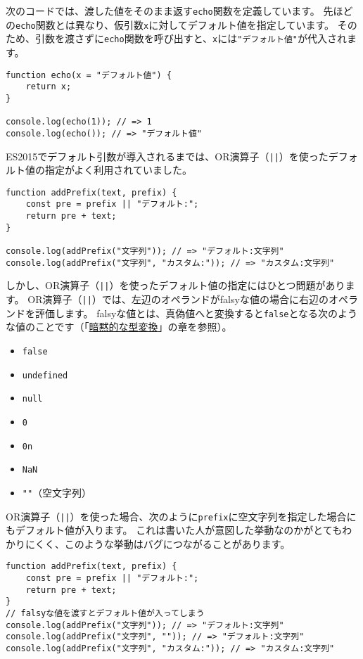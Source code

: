次のコードでは、渡した値をそのまま返す\texttt{echo}関数を定義しています。
先ほどの\texttt{echo}関数とは異なり、仮引数\texttt{x}に対してデフォルト値を指定しています。
そのため、引数を渡さずに\texttt{echo}関数を呼び出すと、\texttt{x}には\texttt{"デフォルト値"}が代入されます。

\begin{lstlisting}
function echo(x = "デフォルト値") {
    return x;
}

console.log(echo(1)); // => 1
console.log(echo()); // => "デフォルト値"
\end{lstlisting}

\enlargethispage{\baselineskip}ES2015でデフォルト引数が導入されるまでは、OR演算子（\texttt{||}）を使ったデフォルト値の指定がよく利用されていました。

\begin{lstlisting}
function addPrefix(text, prefix) {
    const pre = prefix || "デフォルト:";
    return pre + text;
}

console.log(addPrefix("文字列")); // => "デフォルト:文字列"
console.log(addPrefix("文字列", "カスタム:")); // => "カスタム:文字列"
\end{lstlisting}

しかし、OR演算子（\texttt{||}）を使ったデフォルト値の指定にはひとつ問題があります。
OR演算子（\texttt{||}）では、左辺のオペランドがfalsyな値の場合に右辺のオペランドを評価します。
falsyな値とは、真偽値へと変換すると\texttt{false}となる次のような値のことです（「\hyperlink{implicit-coercion}{暗黙的な型変換}」の章を参照）。

\begin{itemize}
\item
  \texttt{false}
\item
  \texttt{undefined}
\item
  \texttt{null}
\item
  \texttt{0}
\item
  \texttt{0n}
\item
  \texttt{NaN}
\item
  \texttt{""}（空文字列）
\end{itemize}

OR演算子（\texttt{||}）を使った場合、次のように\texttt{prefix}に空文字列を指定した場合にもデフォルト値が入ります。
これは書いた人が意図した挙動なのかがとてもわかりにくく、このような挙動はバグにつながることがあります。

\begin{lstlisting}
function addPrefix(text, prefix) {
    const pre = prefix || "デフォルト:";
    return pre + text;
}
// falsyな値を渡すとデフォルト値が入ってしまう
console.log(addPrefix("文字列")); // => "デフォルト:文字列"
console.log(addPrefix("文字列", "")); // => "デフォルト:文字列"
console.log(addPrefix("文字列", "カスタム:")); // => "カスタム:文字列"
\end{lstlisting}

